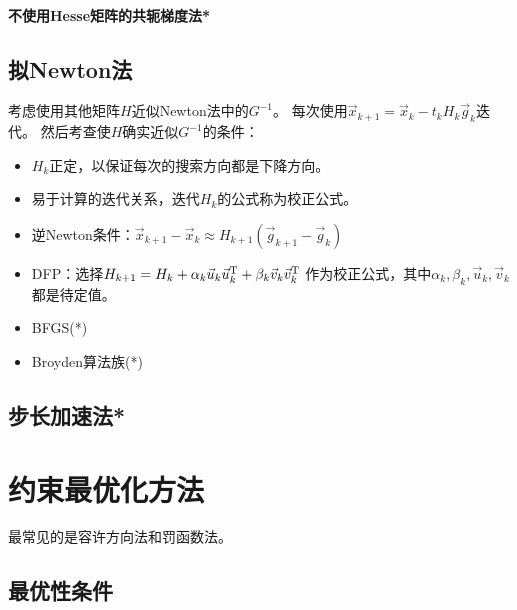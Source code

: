 \paragraph{不使用Hesse矩阵的共轭梯度法*}

\subsection{拟Newton法}

考虑使用其他矩阵$H$近似Newton法中的$G^{-1}$。
每次使用$\vec{x}_{k+1}=\vec{x}_k - t_k H_k \vec{g}_k$迭代。
然后考查使$H$确实近似$G^{-1}$的条件：
\begin{itemize}
    \item $H_k$正定，以保证每次的搜索方向都是下降方向。
    \item 易于计算的迭代关系，迭代$H_k$的公式称为校正公式。
    \item 逆Newton条件：$\vec{x}_{k+1}-\vec{x}_k\approx H_{k+1} (\vec{g}_{k+1} - \vec{g}_k)$
\end{itemize}

\begin{itemize}
    \item DFP：选择$H_{k+1}=H_k + \alpha_k \vec{u}_k \vec{u}_k^\mathrm{T} + \beta_k \vec{v}_k \vec{v}_k^\mathrm{T}$
    作为校正公式，其中$\alpha_k,\beta_k,\vec{u}_k,\vec{v}_k$都是待定值。
    \item BFGS(*)
    \item Broyden算法族(*)
\end{itemize}

\subsection{步长加速法*}

\section{约束最优化方法}

最常见的是容许方向法和罚函数法。

\subsection{最优性条件}

